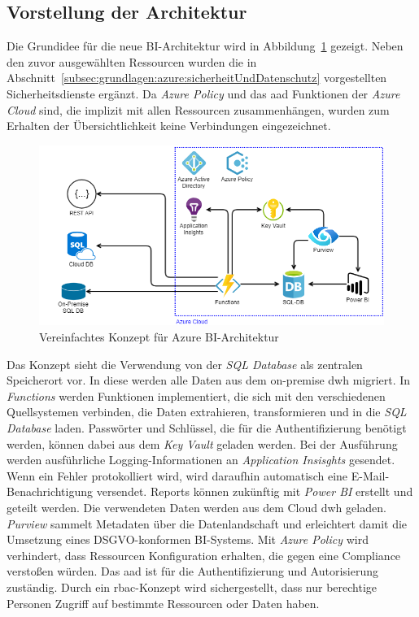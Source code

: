 \subsection{Vorstellung der Architektur}
Die Grundidee für die neue BI-Architektur wird in Abbildung~\ref{fig:chap03_4_konzeptArchitektur_offen} gezeigt. Neben den zuvor ausgewählten Ressourcen wurden die in Abschnitt~\ref{subsec:grundlagen:azure:sicherheitUndDatenschutz} vorgestellten Sicherheitsdienste ergänzt. Da \textit{Azure Policy} und das \ac{aad} Funktionen der \textit{Azure Cloud} sind, die implizit mit allen Ressourcen zusammenhängen, wurden zum Erhalten der Übersichtlichkeit keine Verbindungen eingezeichnet.

\begin{figure}[htbp]
 \centering
 \includegraphics[width=\textwidth]{gfx/konzept_1.png}
 \caption{Vereinfachtes Konzept für Azure BI-Architektur}
\label{fig:chap03_4_konzeptArchitektur_offen}
\end{figure}

Das Konzept sieht die Verwendung von der \textit{SQL Database} als zentralen Speicherort vor. In diese werden alle Daten aus dem on-premise \ac{dwh} migriert. In \textit{Functions} werden Funktionen implementiert, die sich mit den verschiedenen Quellsystemen verbinden, die Daten extrahieren, transformieren und in die \textit{SQL Database} laden. Passwörter und Schlüssel, die für die Authentifizierung benötigt werden, können dabei aus dem \textit{Key Vault} geladen werden. Bei der Ausführung werden ausführliche Logging-Informationen an \textit{Application Insisghts} gesendet. Wenn ein Fehler protokolliert wird, wird daraufhin automatisch eine E-Mail-Benachrichtigung versendet. Reports können zukünftig mit \textit{Power BI} erstellt und geteilt werden. Die verwendeten Daten werden aus dem Cloud \ac{dwh} geladen. \textit{Purview} sammelt Metadaten über die Datenlandschaft und erleichtert damit die Umsetzung eines DSGVO-konformen BI-Systems. Mit \textit{Azure Policy} wird verhindert, dass Ressourcen Konfiguration erhalten, die gegen eine Compliance verstoßen würden. Das \ac{aad} ist für die Authentifizierung und Autorisierung zuständig. Durch ein \ac{rbac}-Konzept wird sichergestellt, dass nur berechtige Personen Zugriff auf bestimmte Ressourcen oder Daten haben. 

